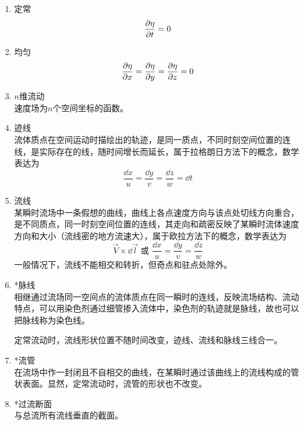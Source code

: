 \begin{enumerate}
	\item 定常
	\begin{equation}
		\pdv{\eta}{t} = 0
	\end{equation}
    \item 均匀
    \begin{equation}
    	\pdv{\eta}{x} = \pdv{\eta}{y} = \pdv{\eta}{z} = 0
    \end{equation}
    \item $n$维流动\\
    速度场为$n$个空间坐标的函数。
    \item 迹线\\
    流体质点在空间运动时描绘出的轨迹，是同一质点，不同时刻空间位置的连线，是实际存在的线，随时间增长而延长，属于拉格朗日方法下的概念，数学表达为
    \begin{equation}
    	\dfrac{\dd{x}}{u} = \dfrac{\dd{y}}{v} = \dfrac{\dd{z}}{w} = \dd{t}
    \end{equation}
    \item 流线\\
    某瞬时流场中一条假想的曲线，曲线上各点速度方向与该点处切线方向重合，是不同质点，同一时刻空间位置的连线，其走向和疏密反映了某瞬时流体速度方向和大小（流线密的地方流速大），属于欧拉方法下的概念，数学表达为
    \begin{equation}
    	\vec{V} \times \dd{\vec{l}} \text{~或~} \dfrac{\dd{x}}{u} = \dfrac{\dd{y}}{v} = \dfrac{\dd{z}}{w}
    \end{equation}
    一般情况下，流线不能相交和转折，但奇点和驻点处除外。
    \item *脉线\\
    相继通过流场同一空间点的流体质点在同一瞬时的连线，反映流场结构、流动特点，可以用染色剂通过细管掺入流体中，染色剂的轨迹就是脉线，故也可以把脉线称为染色线。
    \begin{tip}
    	定常流动时，流线形状位置不随时间改变，迹线、流线和脉线三线合一。
    \end{tip}
    \item *流管\\
    在流场中作一封闭且不自相交的曲线，在某瞬时通过该曲线上的流线构成的管状表面。显然，定常流动时，流管的形状也不改变。
    \item *过流断面\\
    与总流所有流线垂直的截面。
\end{enumerate}



